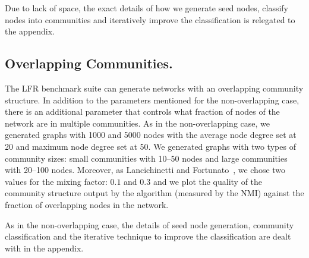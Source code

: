 Due to lack of space, the exact details of how we generate seed nodes, classify
nodes into communities and iteratively improve the classification is relegated
to the appendix. 

\subsection{Overlapping Communities.}
The LFR benchmark suite can generate networks with an overlapping community
structure.  In addition to the parameters mentioned for the non-overlapping
case, there is an additional parameter that controls what fraction of nodes of
the network are in multiple communities.  As in the non-overlapping case, we
generated graphs with 1000 and 5000 nodes with the average node degree set at 20
and maximum node degree set at 50. We generated graphs with two types of
community sizes: small communities with 10--50 nodes and large communities with
20--100 nodes.  Moreover, as Lancichinetti and Fortunato~\cite{LF09}, we chose
two values for the mixing factor: $0.1$ and $0.3$ and we plot the quality of the
community structure output by the algorithm (measured by the NMI) against the
fraction of overlapping nodes in the network.

As in the non-overlapping case, the details of seed node generation, community
classification and the iterative technique to improve the classification are
dealt with in the appendix.


